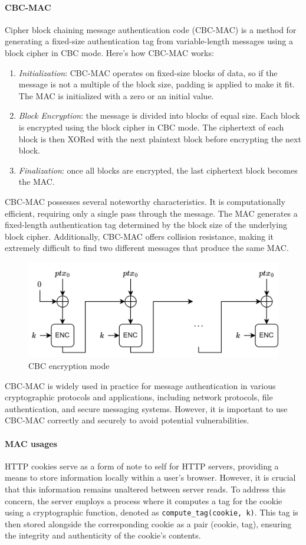 \paragraph*{CBC-MAC}
Cipher block chaining message authentication code (CBC-MAC) is a method for generating a fixed-size authentication tag from variable-length messages using a block cipher in CBC mode.
Here's how CBC-MAC works:
\begin{enumerate}
    \item \textit{Initialization}: CBC-MAC operates on fixed-size blocks of data, so if the message is not a multiple of the block size, padding is applied to make it fit. 
        The MAC is initialized with a zero or an initial value.
    \item \textit{Block Encryption}: the message is divided into blocks of equal size. 
        Each block is encrypted using the block cipher in CBC mode. 
        The ciphertext of each block is then XORed with the next plaintext block before encrypting the next block.
    \item \textit{Finalization}: once all blocks are encrypted, the last ciphertext block becomes the MAC.
\end{enumerate}
CBC-MAC possesses several noteworthy characteristics. 
It is computationally efficient, requiring only a single pass through the message. 
The MAC generates a fixed-length authentication tag determined by the block size of the underlying block cipher. 
Additionally, CBC-MAC offers collision resistance, making it extremely difficult to find two different messages that produce the same MAC.
\begin{figure}[H]
    \centering
    \includegraphics[width=0.75\linewidth]{images/cbcmac.png}
    \caption{CBC encryption mode}
\end{figure}
CBC-MAC is widely used in practice for message authentication in various cryptographic protocols and applications, including network protocols, file authentication, and secure messaging systems. 
However, it is important to use CBC-MAC correctly and securely to avoid potential vulnerabilities.

\paragraph*{MAC usages}
HTTP cookies serve as a form of note to self for HTTP servers, providing a means to store information locally within a user's browser. 
However, it is crucial that this information remains unaltered between server reads. 
To address this concern, the server employs a process where it computes a tag for the cookie using a cryptographic function, denoted as \texttt{compute\_tag(cookie, k)}. 
This tag is then stored alongside the corresponding cookie as a pair (cookie, tag), ensuring the integrity and authenticity of the cookie's contents.

